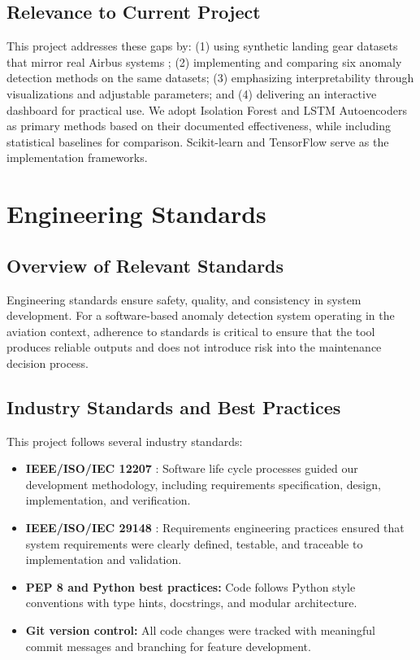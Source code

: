 \documentclass{CLS_zhou430}
\begin{document}
\section{Relevance to Current Project}
This project addresses these gaps by: (1) using synthetic landing gear datasets that mirror real Airbus systems \cite{uwe2023landing}; (2) implementing and comparing six anomaly detection methods on the same datasets; (3) emphasizing interpretability through visualizations and adjustable parameters; and (4) delivering an interactive dashboard for practical use. We adopt Isolation Forest \cite{liu2008isolation} and LSTM Autoencoders \cite{malhotra2016lstm} as primary methods based on their documented effectiveness, while including statistical baselines for comparison. Scikit-learn \cite{pedregosa2011scikit} and TensorFlow \cite{tensorflow2015} serve as the implementation frameworks.


\chapter{Engineering Standards}

\section{Overview of Relevant Standards}
Engineering standards ensure safety, quality, and consistency in system development. For a software-based anomaly detection system operating in the aviation context, adherence to standards is critical to ensure that the tool produces reliable outputs and does not introduce risk into the maintenance decision process.

\section{Industry Standards and Best Practices}
This project follows several industry standards:
\begin{itemize}
    \item \textbf{IEEE/ISO/IEC 12207} \cite{ieee12207}: Software life cycle processes guided our development methodology, including requirements specification, design, implementation, and verification.
    \item \textbf{IEEE/ISO/IEC 29148} \cite{ieee29148}: Requirements engineering practices ensured that system requirements were clearly defined, testable, and traceable to implementation and validation.
    \item \textbf{PEP 8 and Python best practices:} Code follows Python style conventions with type hints, docstrings, and modular architecture.
    \item \textbf{Git version control:} All code changes were tracked with meaningful commit messages and branching for feature development.
\end{itemize}
\end{document}
